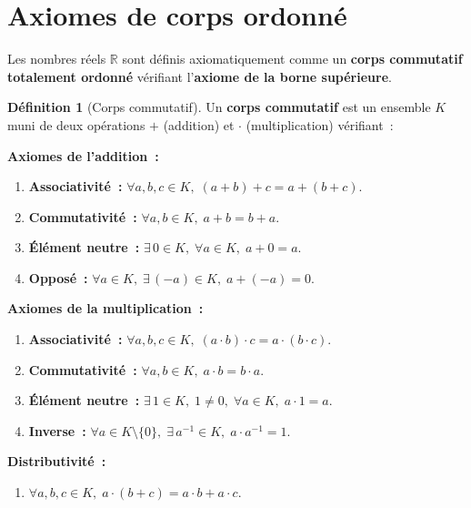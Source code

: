 \documentclass[12pt,a4paper,openany]{book}
\theoremstyle{definition}
\newtheorem{definition}{Définition}[chapter]
\newcommand{\R}{\mathbb{R}}
\begin{document}
\section{Axiomes de corps ordonné}
\label{sec:axiomes}

Les nombres réels $\R$ sont définis axiomatiquement comme un \textbf{corps commutatif totalement ordonné} vérifiant l'\textbf{axiome de la borne supérieure}.

\begin{definition}[Corps commutatif]\label{def:corps}
  Un \textbf{corps commutatif} est un ensemble $K$ muni de deux opérations $+$ (addition) et $\cdot$ (multiplication) vérifiant~:

  \medskip
  \textbf{Axiomes de l'addition~:}
  \begin{enumerate}[label=(A\arabic*)]
    \item \textbf{Associativité~:} $\forall a,b,c \in K,\; (a+b)+c = a+(b+c)$.
    \item \textbf{Commutativité~:} $\forall a,b \in K,\; a+b = b+a$.
    \item \textbf{Élément neutre~:} $\exists\, 0 \in K,\; \forall a \in K,\; a + 0 = a$.
    \item \textbf{Opposé~:} $\forall a \in K,\; \exists\, (-a) \in K,\; a + (-a) = 0$.
  \end{enumerate}

  \medskip
  \textbf{Axiomes de la multiplication~:}
  \begin{enumerate}[label=(M\arabic*)]
    \item \textbf{Associativité~:} $\forall a,b,c \in K,\; (a \cdot b) \cdot c = a \cdot (b \cdot c)$.
    \item \textbf{Commutativité~:} $\forall a,b \in K,\; a \cdot b = b \cdot a$.
    \item \textbf{Élément neutre~:} $\exists\, 1 \in K,\; 1 \neq 0,\; \forall a \in K,\; a \cdot 1 = a$.
    \item \textbf{Inverse~:} $\forall a \in K \setminus \{0\},\; \exists\, a^{-1} \in K,\; a \cdot a^{-1} = 1$.
  \end{enumerate}

  \medskip
  \textbf{Distributivité~:}
  \begin{enumerate}[label=(D)]
    \item $\forall a,b,c \in K,\; a \cdot (b + c) = a \cdot b + a \cdot c$.
  \end{enumerate}
\end{definition}
\end{document}
